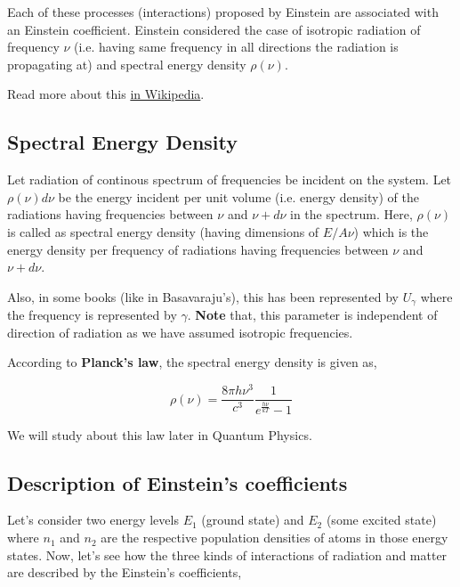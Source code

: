 \documentclass[12pt]{article}
\begin{document}
Each of these processes (interactions) proposed by Einstein are associated with an Einstein coefficient. Einstein considered the case of isotropic radiation of frequency $\nu$ (i.e. having same frequency in all directions the radiation is propagating at) and spectral energy density $\rho(\nu)$. \vspace{.2cm}

Read more about this \href{https://en.wikipedia.org/wiki/Einstein_coefficients}{in Wikipedia}.

\subsection{Spectral Energy Density}

Let radiation of continous spectrum of frequencies be incident on the system. Let $\rho(\nu)d\nu$ be the energy incident per unit volume (i.e. energy density) of the radiations having frequencies between $\nu$ and $\nu + d\nu$ in the spectrum. Here, $\rho(\nu)$ is called as spectral energy density (having dimensions of $E/A\nu$) which is the energy density per frequency of radiations having frequencies between $\nu$ and $\nu + d\nu$. \vspace{.2cm}

Also, in some books (like in Basavaraju's), this has been represented by $U_{\gamma}$ where the frequency is represented by $\gamma$. \textbf{Note} that, this parameter is independent of direction of radiation as we have assumed isotropic frequencies. \vspace{.2cm}

According to \textbf{Planck's law}, the spectral energy density is given as,

\begin{equation}
    \rho(\nu) = \frac{8\pi h\nu^3}{c^3} \frac{1}{e^\frac{h\nu}{kT} - 1}
\end{equation}

We will study about this law later in Quantum Physics.

\subsection{Description of Einstein's coefficients}

Let's consider two energy levels $E_{1}$ (ground state) and $E_{2}$ (some excited state) where $n_{1}$ and $n_{2}$ are the respective population densities of atoms in those energy states. Now, let's see how the three kinds of interactions of radiation and matter are described by the Einstein's coefficients,
\end{document}
